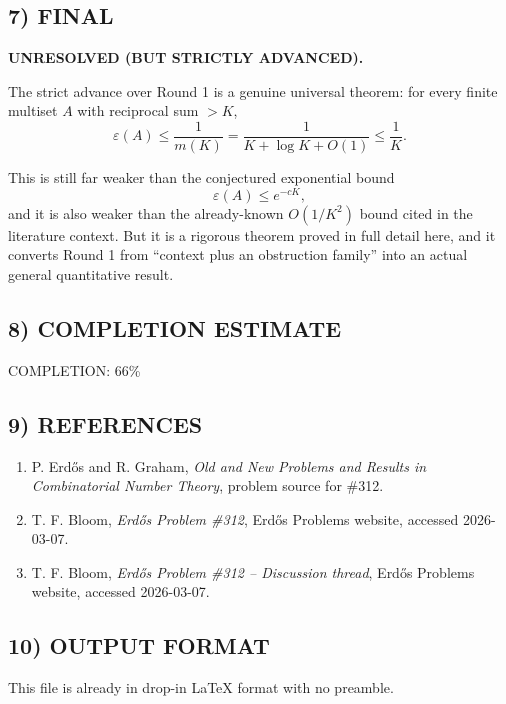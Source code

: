 \subsection*{7) FINAL}
\textbf{UNRESOLVED (BUT STRICTLY ADVANCED).}

The strict advance over Round 1 is a genuine universal theorem:
for every finite multiset $A$ with reciprocal sum $>K$,
\[
\varepsilon(A)\le \frac{1}{m(K)}=\frac{1}{K+\log K+O(1)}\le \frac1K.
\]

This is still far weaker than the conjectured exponential bound
\[
\varepsilon(A)\le e^{-cK},
\]
and it is also weaker than the already-known $O(1/K^2)$ bound cited in the literature context. But it is a rigorous theorem proved in full detail here, and it converts Round 1 from ``context plus an obstruction family'' into an actual general quantitative result.

\subsection*{8) COMPLETION ESTIMATE}
COMPLETION: 66\%

\subsection*{9) REFERENCES}
\begin{enumerate}
\item P. Erd\H{o}s and R. Graham, \emph{Old and New Problems and Results in Combinatorial Number Theory}, problem source for \#312.
\item T. F. Bloom, \emph{Erd\H{o}s Problem \#312}, Erd\H{o}s Problems website, accessed 2026-03-07.
\item T. F. Bloom, \emph{Erd\H{o}s Problem \#312 -- Discussion thread}, Erd\H{o}s Problems website, accessed 2026-03-07.
\end{enumerate}

\subsection*{10) OUTPUT FORMAT}
This file is already in drop-in LaTeX format with no preamble.
